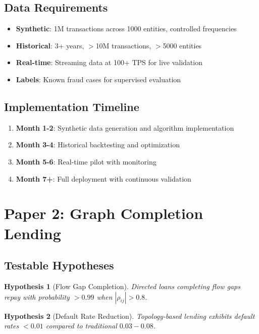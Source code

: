 \documentclass[12pt]{article}
\newtheorem{hypothesis}{Hypothesis}
\begin{document}
\subsection{Data Requirements}

\begin{itemize}
    \item \textbf{Synthetic}: 1M transactions across 1000 entities, controlled frequencies
    \item \textbf{Historical}: 3+ years, $>$10M transactions, $>$5000 entities
    \item \textbf{Real-time}: Streaming data at 100+ TPS for live validation
    \item \textbf{Labels}: Known fraud cases for supervised evaluation
\end{itemize}

\subsection{Implementation Timeline}

\begin{enumerate}
    \item \textbf{Month 1-2}: Synthetic data generation and algorithm implementation
    \item \textbf{Month 3-4}: Historical backtesting and optimization
    \item \textbf{Month 5-6}: Real-time pilot with monitoring
    \item \textbf{Month 7+}: Full deployment with continuous validation
\end{enumerate}

\section{Paper 2: Graph Completion Lending}

\subsection{Testable Hypotheses}

\begin{hypothesis}[Flow Gap Completion]
Directed loans completing flow gaps repay with probability $> 0.99$ when $|\rho_{ij}| > 0.8$.
\end{hypothesis}

\begin{hypothesis}[Default Rate Reduction]
Topology-based lending exhibits default rates $< 0.01$ compared to traditional $0.03-0.08$.
\end{hypothesis}
\end{document}
